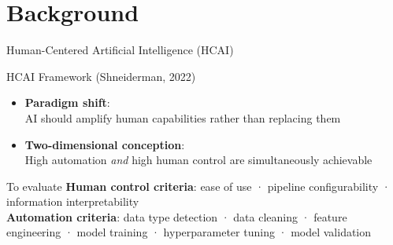 \documentclass[aspectratio=169,10pt,english,dvipsnames]{beamer}
\begin{document}
\section{Background}

\begin{frame}{Human-Centered Artificial Intelligence (HCAI)} \small
  \begin{minipage}{0.5\textwidth}
    \begin{block}{HCAI Framework (Shneiderman, 2022)}
      \begin{itemize}
        \item \textbf{Paradigm shift}:\\
          AI should amplify human capabilities rather than replacing them
        \item \textbf{Two-dimensional conception}:\\
          High automation \emph{and} high human control are
          simultaneously achievable
      \end{itemize}
    \end{block}
    \vspace{3mm}
    \begin{exampleblock}{To evaluate}
        \textbf{Human control criteria}:
    ease of use · pipeline configurability · information interpretability\\[2mm]
    \textbf{Automation criteria}:
    data type detection · data cleaning · feature engineering ·
    model training · hyperparameter tuning · model validation
    \end{exampleblock}
  \end{minipage}%
  \begin{minipage}{0.5\textwidth}
    \centering
\end{minipage}
\end{frame}
\end{document}
